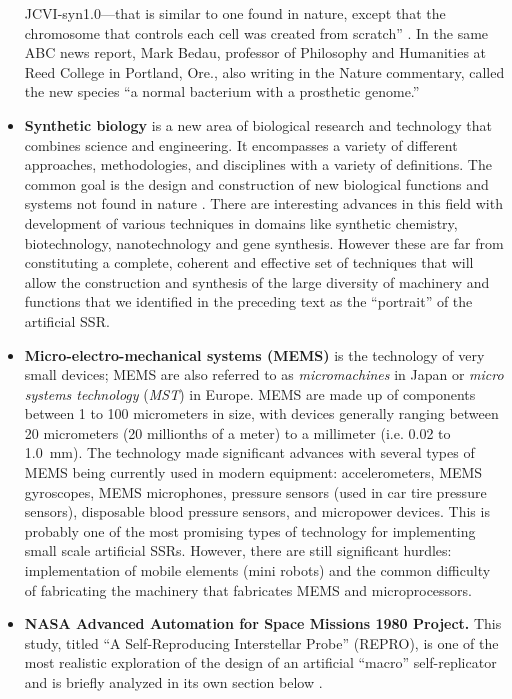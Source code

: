 \begin{itemize}
JCVI-syn1.0---that is similar to one found in nature, except that the
chromosome that controls each cell was created from scratch” \citep{smith2010, gibsonetal2010}. In the same ABC news report,
Mark Bedau, professor of Philosophy and
Humanities at Reed College in Portland, Ore., also writing in the
Nature commentary, called the new species ``a normal
bacterium with a prosthetic genome.''\citep{smith2010}
\item \textbf{Synthetic biology} is a new area of biological
research and technology that combines science and engineering. It
encompasses a variety of different approaches, methodologies, and
disciplines with a variety of definitions. The common goal is the
design and construction of new biological functions and systems not
found in nature \citep{heinemann2006}. There are interesting advances in this field with
development of various techniques in domains like synthetic chemistry,
biotechnology, nanotechnology and gene synthesis. However these are far
from constituting a complete, coherent and effective set of techniques
that will allow the construction and synthesis of the large diversity
of machinery and functions that we identified in the preceding text as
the “portrait” of the artificial SSR.
\item \textbf{Micro-electro-mechanical systems (MEMS)} is the technology
of very small devices; MEMS are also referred to as
\textit{micromachines} in Japan or \textit{micro systems technology} (\textit{MST}) in Europe. 
MEMS are made up of components between 1 to
100 micrometers in size, with devices generally ranging between 20 micrometers (20 millionths of a meter)
to a millimeter (i.e. 0.02 to 1.0~mm)\citep{lyshevski2000}. The technology made significant
advances with several types of MEMS being currently used in modern
equipment:  accelerometers, MEMS gyroscopes, MEMS microphones, pressure
sensors (used in car tire pressure sensors), disposable blood pressure
sensors, and micropower devices. This is probably one of the most
promising types of technology for implementing small scale artificial
SSRs. However, there are still significant hurdles: implementation of
mobile elements (mini robots) and the common difficulty of fabricating
the machinery that fabricates MEMS and microprocessors.
\item \textbf{NASA Advanced Automation for Space Missions 1980 Project.}
This study, titled ``A Self-Reproducing Interstellar Probe'' (REPRO), 
is one of the most realistic exploration of the design of
an artificial ``macro'' self-replicator and is briefly analyzed in its
own section below \citep{freitas1980}.
\end{itemize}

